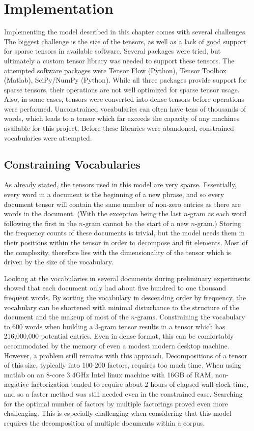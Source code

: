 \documentclass[../ut-dissertation.tex]{subfiles}
\begin{document}
\section{Implementation}
Implementing the model described in this chapter comes with several
challenges.  The biggest challenge is the size of the tensors, as well
as a lack of good support for sparse tensors in available software.
Several packages were tried, but ultimately a custom tensor library
was needed to support these tensors.  The attempted software packages
were Tensor Flow (Python), Tensor Toolbox (Matlab),  SciPy/NumPy
(Python).  While all three packages provide support for sparse
tensors, their operations are not well optimized for sparse tensor
usage.  Also, in some cases, tensors were converted into dense tensors
before operations were performed.  Unconstrained vocabularies can
often have tens of thousands of words, which leads to a tensor which
far exceeds the capacity of any machines available for this project.
Before these libraries were abandoned, constrained vocabularies were
attempted.

\subsection{Constraining Vocabularies}
As already stated, the tensors used in this model are very sparse.
Essentially, every word in a document is the beginning of a new
phrase, and so every document tensor will contain the same number of
non-zero entries as there are words in the document.  (With the
exception being the last $n$-gram as each word following the first in
the $n$-gram cannot be the start of a new $n$-gram.)
Storing the frequency counts of these documents is trivial, but the
model needs them in their positions within the tensor in order to
decompose and fit elements.  Most of the complexity, therefore lies
with the dimensionality of the tensor which is driven by the size of
the vocabulary.

Looking at the vocabularies in several documents during preliminary
experiments showed that each document only had about five hundred to
one thousand frequent words.  By sorting the vocabulary in descending
order by frequency, the vocabulary can be shortened with minimal
disturbance to the structure of the document and the makeup of most of
the $n$-grams.  Constraining the vocabulary to 600 words when building
a 3-gram tensor results in a tensor which has 216,000,000 potential
entries.  Even in dense format, this can be comfortably accommodated
by the memory of even a modest modern desktop machine.  However, a
problem still remains with this approach.  Decompositions of a tensor
of this size, typically into 100-200 factors, requires too much time.
When using matlab on an 8-core 3.4GHz Intel linux machine with 16GB of
RAM, non-negative factorization tended to require about 2 hours of
elapsed wall-clock time, and so a faster method was still needed even
in the constrained case.  Searching for the optimal number of factors
by multiple factorings proved even more challenging.  This is
especially challenging when considering that this model requires the
decomposition of multiple documents within a corpus.
\end{document}

